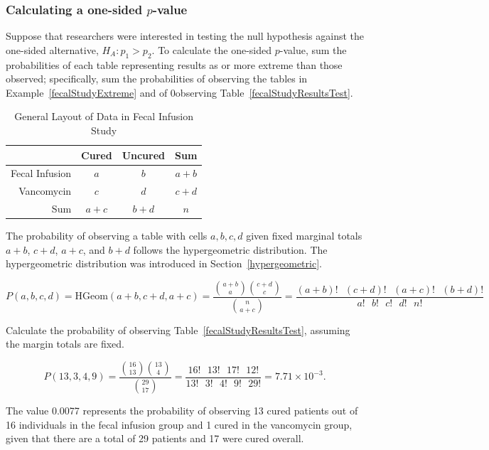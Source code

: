 \subsubsection{Calculating a one-sided $p$-value}

Suppose that researchers were interested in testing the null hypothesis against the one-sided alternative, $H_A: p_1 > p_2$. To calculate the one-sided $p$-value, sum the probabilities of each table representing results as or more extreme than those observed; specifically, sum the probabilities of observing the tables in Example~\ref{fecalStudyExtreme} and of 0observing Table~\ref{fecalStudyResultsTest}.

\begin{table}[h]
	\centering
	\begin{tabular}{rccc}
		\hline
		& Cured & Uncured & Sum \\ 
		\hline
		Fecal Infusion & $a$ & $b$ & $a+b$ \\ 
		Vancomycin & $c$ & $d$ & $c+d$ \\ 
		Sum & $a+c$ & $b+d$ & $n$ \\ 
		\hline
	\end{tabular}
	\caption{General Layout of Data in Fecal Infusion Study} 
	\label{fecalStudyGeneral}
\end{table}


The probability of observing a table with cells $a, b, c, d$ given fixed marginal totals $a+b$, $c+d$, $a + c$, and $b +d$ follows the hypergeometric distribution.  The hypergeometric distribution was introduced in Section~\ref{hypergeometric}.

\[P(a,b,c,d) = \text{HGeom}(a+b, c+d, a+c) = \dfrac{ {a+b \choose a} {c+d \choose c}}{{n \choose a+c}} = \dfrac{(a+b)! \text{ } (c+d)! \text{ } (a+c)! \text{ } (b+d)!}{a! \text{ } b! \text{ } c! \text{ } d! \text{ } n!}\]

\begin{example}{Calculate the probability of observing Table~\ref{fecalStudyResultsTest}, assuming the margin totals are fixed.}

\[P(13, 3, 4, 9) = \dfrac{ {16 \choose 13} {13 \choose 4}}{{29 \choose 17}} = \dfrac{16! \text{ } 13! \text{ } 17! \text{ } 12!}{13! \text{ } 3! \text{ } 4! \text{ } 9! \text{ } 29!} = 7.71 \times 10^{-3}.\]

The value 0.0077 represents the probability of observing 13 cured patients out of 16 individuals in the fecal infusion group and 1 cured in the vancomycin group, given that there are a total of 29 patients and 17 were cured overall.
\end{example}

